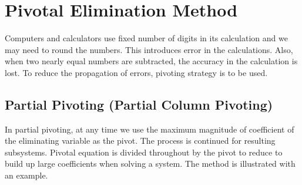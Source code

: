 \documentclass[12pt,class=book,crop=false]{standalone}
\begin{document}
\section{Pivotal Elimination Method}
Computers and calculators use fixed number of digits in its calculation and we may need to round the numbers. This introduces error in the calculations. Also, when two nearly equal numbers are subtracted, the accuracy in the calculation is lost. To reduce the propagation of errors, pivoting strategy is to be used.

\subsection{Partial Pivoting (Partial Column Pivoting)}
In partial pivoting, at any time we use the maximum magnitude of coefficient of the eliminating variable as the pivot. The process is continued for resulting subsystems.  Pivotal equation is divided throughout by the pivot to reduce to build up large coefficients when solving a system. The method is illustrated with an example.
\end{document}
